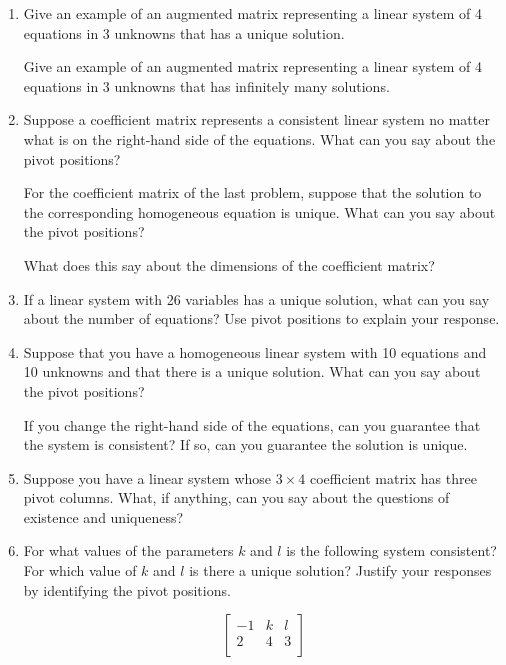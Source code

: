 \documentclass[12pt]{article}
\newcommand{\vs}[1]{\vspace{#1in}}
\begin{document}
\begin{enumerate}
  \vs{1}

  \newpage
\item Give an example of an augmented matrix representing a linear
  system of 4 equations in 3 unknowns that has a unique solution.

  \vs{1.25}
  Give an example of an augmented matrix representing a linear system
  of 4 equations in 3 unknowns that has infinitely many solutions.

  \vs{1.25}

\item Suppose a coefficient matrix represents a consistent linear
  system no matter what is on the right-hand side of the equations.
  What can you say about the pivot positions?

  \vs{1.5}
  For the coefficient matrix of the last problem, suppose that the
  solution to the corresponding homogeneous equation is unique.  What
  can you say about the pivot positions?

  \vs{1}
  What does this say about the dimensions of the coefficient matrix?

  \vs{1}

  \newpage
\item If a linear system with 26 variables has a unique solution, what
  can 
  you say about the number of equations?  Use pivot positions to
  explain your response.

  \vs{1.5}

\item Suppose that you have a homogeneous linear system with 10
  equations and 10 unknowns and that there is a unique solution.  What
  can you say about the pivot positions?

  \vs{1.25}
  If you change the right-hand side of the equations, can you
  guarantee that the system is consistent?  If so, can you guarantee the
  solution is unique.

  \vs{1.25}

\item Suppose you have a linear system whose $3\times4$ coefficient
  matrix has three pivot columns.  What, if anything, can you say
  about the 
  questions of existence and uniqueness?

  \vs{1}

  \newpage
\item For what values of the parameters $k$ and $l$ is the following
  system consistent?  For which value of $k$ and $l$ is there a unique
  solution?  Justify your responses by identifying the pivot positions.

  $$
  \left[
    \begin{array}{cc|c}
      -1 & k & l \\
      2 & 4 & 3 \\
    \end{array}
  \right]
  $$

\end{enumerate}
\end{document}
